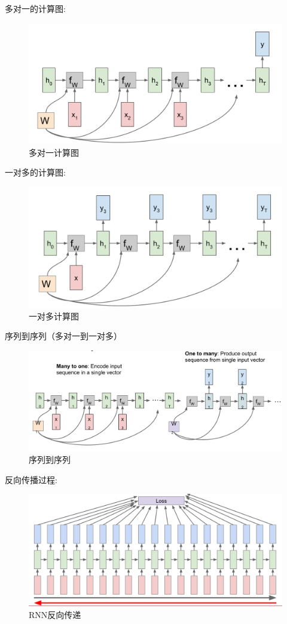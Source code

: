 \documentclass{article}
\begin{document}
多对一的计算图:
\begin{figure}[H]
\centering
\includegraphics[scale=0.4]{figure/RNN_M2O.PNG}
\caption{多对一计算图}
\label{fig:5}
\end{figure}
一对多的计算图:
\begin{figure}[H]
\centering
\includegraphics[scale=0.4]{figure/RNN_O2M.PNG}
\caption{一对多计算图}
\label{fig:6}
\end{figure}
序列到序列（多对一到一对多）
\begin{figure}[H]
\centering
\includegraphics[scale=0.4]{figure/RNN_S2S.PNG}
\caption{序列到序列}
\label{fig:7}
\end{figure}
反向传播过程:
\begin{figure}[H]
\centering
\includegraphics[scale=0.4]{figure/RNN_BP.PNG}
\caption{RNN反向传递}
\label{fig:8}
\end{figure}
\end{document}
